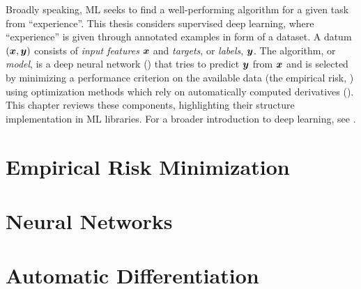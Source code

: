 Broadly speaking, ML seeks to find a well-performing algorithm for a given task
from ``experience''. This thesis considers supervised deep learning, where
``experience'' is given through annotated examples in form of a dataset. A datum
$({\bm{x}}, {\bm{y}})$ consists of \emph{input features} ${\bm{x}}$ and \emph{targets}, or
\emph{labels}, ${\bm{y}}$. The algorithm, or \emph{model}, is a deep neural network
() that tries to predict ${\bm{y}}$ from
${\bm{x}}$ and is selected by minimizing a performance criterion on the available
data (the empirical risk, ) using
optimization methods which rely on automatically computed derivatives
(). This chapter reviews these
components, highlighting their structure \wrt implementation in ML libraries.
For a broader introduction to deep learning, see \eg \cite{goodfellow2016deep}.

\section{Empirical Risk Minimization}\label{sec:background::SupervisedLearning}


\section{Neural Networks}\label{sec:background::DeepNeuralNetworks}


\section{Automatic
  Differentiation}\label{sec:background::GradientBackpropagation}


